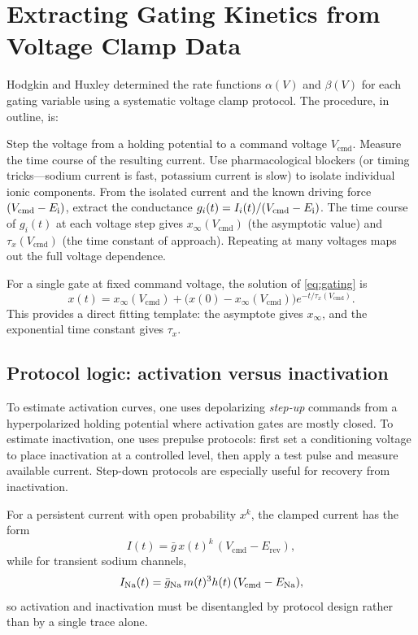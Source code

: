 \section{Extracting Gating Kinetics from Voltage Clamp Data}
\label{sec:extracting-kinetics}

Hodgkin and Huxley determined the rate functions $\alpha(V)$ and $\beta(V)$ for each gating variable using a systematic voltage clamp protocol. The procedure, in outline, is:

Step the voltage from a holding potential to a command voltage $V_{\text{cmd}}$. Measure the time course of the resulting current. Use pharmacological blockers (or timing tricks---sodium current is fast, potassium current is slow) to isolate individual ionic components. From the isolated current and the known driving force $(V_{\text{cmd}} - E_{\mathrm{i}})$, extract the conductance $g_i(t) = I_i(t)/(V_{\text{cmd}} - E_{\mathrm{i}})$. The time course of $g_i(t)$ at each voltage step gives $x_\infty(V_{\text{cmd}})$ (the asymptotic value) and $\tau_x(V_{\text{cmd}})$ (the time constant of approach). Repeating at many voltages maps out the full voltage dependence.

For a single gate at fixed command voltage, the solution of \cref{eq:gating} is
%
\begin{equation}
  x(t) = x_\infty(V_{\text{cmd}}) + \bigl(x(0)-x_\infty(V_{\text{cmd}})\bigr)e^{-t/\tau_x(V_{\text{cmd}})}.
  \label{eq:clamp-gate-solution}
\end{equation}
%
This provides a direct fitting template: the asymptote gives $x_\infty$, and the exponential time constant gives $\tau_x$.

\subsection{Protocol logic: activation versus inactivation}

To estimate activation curves, one uses depolarizing \emph{step-up} commands from a hyperpolarized holding potential where activation gates are mostly closed. To estimate inactivation, one uses prepulse protocols: first set a conditioning voltage to place inactivation at a controlled level, then apply a test pulse and measure available current. Step-down protocols are especially useful for recovery from inactivation.

For a persistent current with open probability $x^k$, the clamped current has the form
%
\begin{equation}
  I(t) = \bar g\,x(t)^k\,(V_{\text{cmd}}-E_{\text{rev}}),
  \label{eq:clamp-persistent}
\end{equation}
%
while for transient sodium channels,
%
\begin{equation}
  I_{\text{Na}}(t)=\bar g_{\text{Na}}\,m(t)^3h(t)\,(V_{\text{cmd}}-E_{\mathrm{Na}}),
  \label{eq:clamp-na}
\end{equation}
%
so activation and inactivation must be disentangled by protocol design rather than by a single trace alone.

